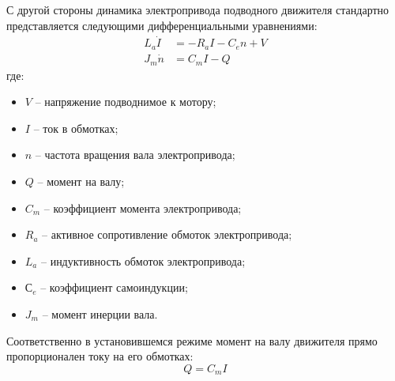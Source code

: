С другой стороны динамика электропривода подводного движителя стандартно представляется следующими дифференциальными уравнениями:
\begin{equation*}
    \begin{array}{rl}
        L_a\dot{I} &=-R_aI-C_e n + V \\
        J_m\dot{n} &= C_m I - Q
    \end{array}
\end{equation*}
\noindent где:
\begin{itemize}
    \item $V$ -- напряжение подводнимое к мотору;
    \item $I$ -- ток в обмотках;
    \item $n$ -- частота вращения вала электропривода;
    \item $Q$ -- момент на валу;
    \item $C_m$ -- коэффициент момента электропривода;
    \item $R_a$ -- активное сопротивление обмоток электропривода;
    \item $L_a$ -- индуктивность обмоток электропривода;
    \item $С_e$ -- коэффициент самоиндукции;
    \item $J_m$ -- момент инерции вала.
\end{itemize}

Соответственно в установившемся режиме момент на валу движителя прямо пропорционален току на его обмотках:
\begin{equation}
    Q = C_mI
\end{equation}



